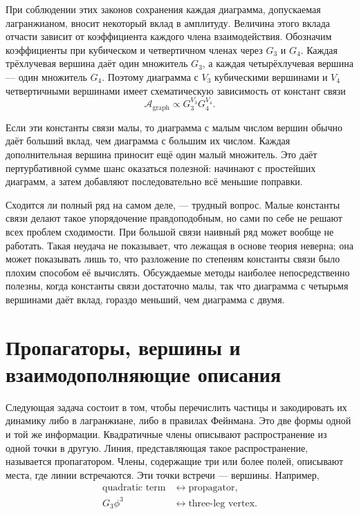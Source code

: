 При соблюдении этих законов сохранения каждая диаграмма, допускаемая лагранжианом, вносит некоторый вклад в амплитуду. Величина этого вклада отчасти зависит от коэффициента каждого члена взаимодействия. Обозначим коэффициенты при кубическом и четвертичном членах через \(G_3\) и \(G_4\). Каждая трёхлучевая вершина даёт один множитель \(G_3\), а каждая четырёхлучевая вершина — один множитель \(G_4\). Поэтому диаграмма с \(V_3\) кубическими вершинами и \(V_4\) четвертичными вершинами имеет схематическую зависимость от констант связи
\begin{equation}
\mathcal{A}_{\mathrm{graph}}
\propto G_3^{V_3}G_4^{V_4}.
\end{equation}

Если эти константы связи малы, то диаграмма с малым числом вершин обычно даёт больший вклад, чем диаграмма с большим их числом. Каждая дополнительная вершина приносит ещё один малый множитель. Это даёт пертурбативной сумме шанс оказаться полезной: начинают с простейших диаграмм, а затем добавляют последовательно всё меньшие поправки.

Сходится ли полный ряд на самом деле, — трудный вопрос. Малые константы связи делают такое упорядочение правдоподобным, но сами по себе не решают всех проблем сходимости. При большой связи наивный ряд может вообще не работать. Такая неудача не показывает, что лежащая в основе теория неверна; она может показывать лишь то, что разложение по степеням константы связи было плохим способом её вычислять. Обсуждаемые методы наиболее непосредственно полезны, когда константы связи достаточно малы, так что диаграмма с четырьмя вершинами даёт вклад, гораздо меньший, чем диаграмма с двумя.

\begin{classroomqa}
\end{classroomqa}

\section{Пропагаторы, вершины и взаимодополняющие описания}

Следующая задача состоит в том, чтобы перечислить частицы и закодировать их динамику либо в лагранжиане, либо в правилах Фейнмана. Это две формы одной и той же информации. Квадратичные члены описывают распространение из одной точки в другую. Линия, представляющая такое распространение, называется пропагатором. Члены, содержащие три или более полей, описывают места, где линии встречаются. Эти точки встречи — вершины. Например,
\begin{equation}
\begin{aligned}
\text{quadratic term}
&\longleftrightarrow \text{propagator},\\
G_3\phi^3
&\longleftrightarrow \text{three-leg vertex}.
\end{aligned}
\end{equation}

